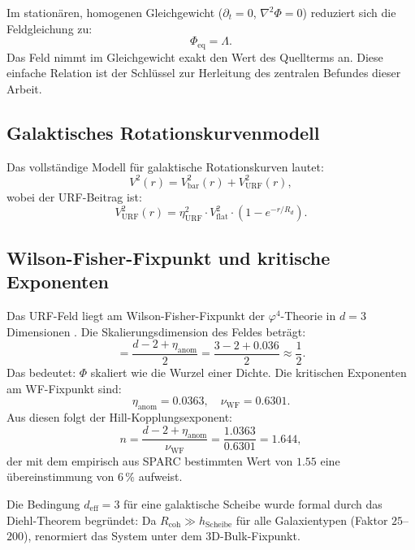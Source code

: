 \documentclass[12pt,a4paper]{article}
\newcommand{\etaURF}{\eta_{\mathrm{URF}}}
\theoremstyle{definition}
\begin{document}
Im stationären, homogenen Gleichgewicht ($\partial_t = 0$,
$\nabla^2\Phi = 0$) reduziert sich die Feldgleichung zu:
\begin{equation}
\Phi_{\mathrm{eq}} = \Lambda.
\label{eq:gleichgewicht}
\end{equation}
Das Feld nimmt im Gleichgewicht exakt den Wert des Quellterms an.
Diese einfache Relation ist der Schlüssel zur Herleitung des
zentralen Befundes dieser Arbeit.

\subsection{Galaktisches Rotationskurvenmodell}

Das vollständige Modell für galaktische Rotationskurven lautet:
\begin{equation}
V^2(r) = V_{\mathrm{bar}}^2(r) + V_{\mathrm{URF}}^2(r),
\end{equation}
wobei der URF-Beitrag ist:
\begin{equation}
\boxed{V_{\mathrm{URF}}^2(r) = \etaURF^2 \cdot V_{\mathrm{flat}}^2
\cdot \left(1 - e^{-r/R_d}\right).}
\label{eq:urf_modell}
\end{equation}

\subsection{Wilson-Fisher-Fixpunkt und kritische Exponenten}

Das URF-Feld liegt am Wilson-Fisher-Fixpunkt der $\varphi^4$-Theorie
in $d = 3$ Dimensionen \cite{Wilson1972}. Die Skalierungsdimension des
Feldes beträgt:
\begin{equation}
[\Phi] = \frac{d - 2 + \eta_{\mathrm{anom}}}{2}
= \frac{3 - 2 + 0.036}{2} \approx \frac{1}{2}.
\end{equation}
Das bedeutet: $\Phi$ skaliert wie die Wurzel einer Dichte.
Die kritischen Exponenten am WF-Fixpunkt sind:
\begin{equation}
\eta_{\mathrm{anom}} = 0.0363, \quad \nu_{\mathrm{WF}} = 0.6301.
\end{equation}
Aus diesen folgt der Hill-Kopplungsexponent:
\begin{equation}
n = \frac{d - 2 + \eta_{\mathrm{anom}}}{\nu_{\mathrm{WF}}}
= \frac{1.0363}{0.6301} = 1.644,
\end{equation}
der mit dem empirisch aus SPARC bestimmten Wert von $1.55$ eine
übereinstimmung von $6\,\%$ aufweist.

Die Bedingung $d_{\mathrm{eff}} = 3$ für eine galaktische Scheibe
wurde formal durch das Diehl-Theorem \cite{Diehl1986} begründet:
Da $R_{\mathrm{coh}} \gg h_{\mathrm{Scheibe}}$ für alle Galaxientypen
(Faktor $25$--$200$), renormiert das System unter dem 3D-Bulk-Fixpunkt.
\end{document}
